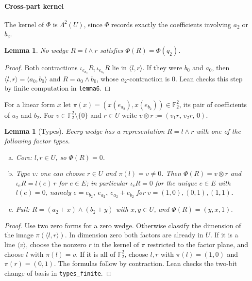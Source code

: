 \documentclass[11pt,a4paper]{article}
\theoremstyle{plain}
\newtheorem{lemma}[theorem]{Lemma}
\theoremstyle{remark}
\theoremstyle{plain}
\newcommand{\F}{\mathbb F_2}
\newcommand{\Dir}{E}
\begin{document}
\paragraph{Cross-part kernel}\label{l4:lem:cross} The kernel of $\Phi$ is $\Lambda^2(U)$, since $\Phi$ records exactly the coefficients involving $a_2$ or $b_2$.

\begin{lemma}\label{l4:lem:noq2}
No wedge $R=l\wedge r$ satisfies $\Phi(R)=\Phi(q_2)$.
\end{lemma}

\begin{proof}
Both contractions $\iota_{e_{a_2}}R,\iota_{e_{b_2}}R$ lie in $\langle l,r\rangle$. If they were $b_0$ and $a_0$, then $\langle l,r\rangle=\langle a_0,b_0\rangle$ and $R=a_0\wedge b_0$, whose $a_2$-contraction is $0$. Lean checks this step by finite computation in \nolinkurl{lemma6}.
\end{proof}

For a linear form $x$ let $\pi(x)=(x(e_{a_2}),x(e_{b_2}))\in\F^2$, its pair of coefficients of $a_2$ and $b_2$. For $v\in\F^2\setminus\{0\}$ and $r\in U$ write $v\otimes r:=(v_1r,\,v_2r,\,0)$.

\begin{lemma}[Types]\label{l4:lem:types}
Every wedge has a representation $R=l\wedge r$ with one of the following factor types.
\begin{enumerate}[(a)]
  \item \emph{Core:} $l,r\in U$, so $\Phi(R)=0$.
  \item \emph{Type $v$:} one can choose $r\in U$ and $\pi(l)=v\neq0$. Then $\Phi(R)=v\otimes r$ and $\iota_eR=l(e)\,r$ for $e\in\Dir$; in particular $\iota_eR=0$ for the unique $e\in\Dir$ with $l(e)=0$, namely $e=e_{b_2},\ e_{a_2},\ e_{a_2}+e_{b_2}$ for $v=(1,0),(0,1),(1,1)$.
  \item \emph{Full:} $R=(a_2+x)\wedge(b_2+y)$ with $x,y\in U$, and $\Phi(R)=(y,x,1)$.
\end{enumerate}
\end{lemma}

\begin{proof}
Use two zero forms for a zero wedge. Otherwise classify the dimension of the image $\pi(\langle l,r\rangle)$. In dimension zero both factors are already in $U$. If it is a line $\langle v\rangle$, choose the nonzero $r$ in the kernel of $\pi$ restricted to the factor plane, and choose $l$ with $\pi(l)=v$. If it is all of $\F^2$, choose $l,r$ with $\pi(l)=(1,0)$ and $\pi(r)=(0,1)$. The formulas follow by contraction. Lean checks the two-bit change of basis in \nolinkurl{types_finite}.
\end{proof}
\end{document}
